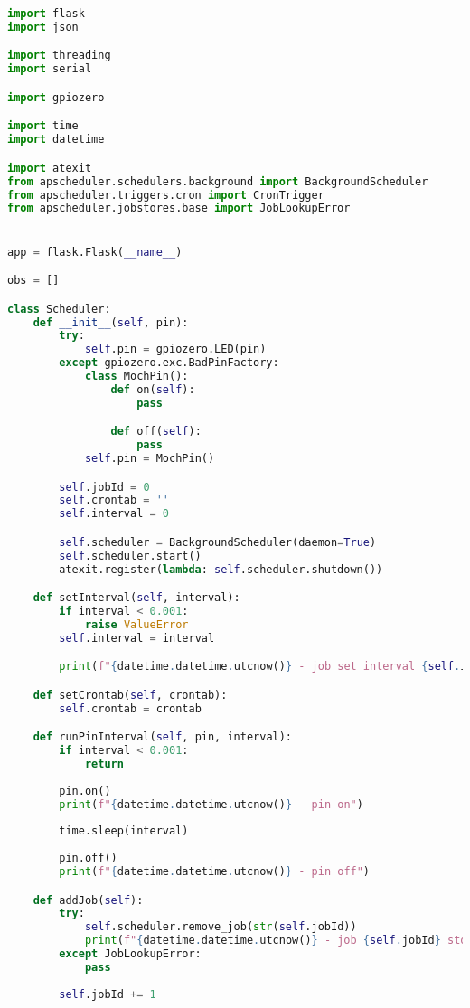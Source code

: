 \documentclass[a4paper,12pt,twoside,openright,titlepage]{book}
\begin{document}
\begin{lstlisting}[title={raspberrypi/api/data.py}, language=Python]
import flask
import json

import threading
import serial

import gpiozero

import time
import datetime

import atexit
from apscheduler.schedulers.background import BackgroundScheduler
from apscheduler.triggers.cron import CronTrigger
from apscheduler.jobstores.base import JobLookupError


app = flask.Flask(__name__)

obs = []

class Scheduler:
    def __init__(self, pin):
        try:
            self.pin = gpiozero.LED(pin)
        except gpiozero.exc.BadPinFactory:
            class MochPin():
                def on(self):
                    pass

                def off(self):
                    pass
            self.pin = MochPin()

        self.jobId = 0
        self.crontab = ''
        self.interval = 0

        self.scheduler = BackgroundScheduler(daemon=True)
        self.scheduler.start()
        atexit.register(lambda: self.scheduler.shutdown())

    def setInterval(self, interval):
        if interval < 0.001:
            raise ValueError
        self.interval = interval

        print(f"{datetime.datetime.utcnow()} - job set interval {self.interval}")

    def setCrontab(self, crontab):
        self.crontab = crontab

    def runPinInterval(self, pin, interval):
        if interval < 0.001:
            return
        
        pin.on()
        print(f"{datetime.datetime.utcnow()} - pin on")
        
        time.sleep(interval)
        
        pin.off()
        print(f"{datetime.datetime.utcnow()} - pin off")

    def addJob(self):
        try:
            self.scheduler.remove_job(str(self.jobId))
            print(f"{datetime.datetime.utcnow()} - job {self.jobId} stopped")
        except JobLookupError:
            pass
        
        self.jobId += 1


\end{lstlisting}
\end{document}
